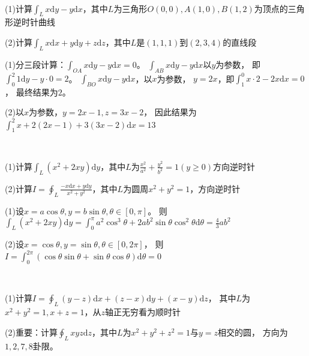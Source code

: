~

\begin{exercise}[折线积分]
  (1)计算$\int_L x\mathrm{d} y - y\mathrm{d} x$，其中$L$为三角形$O(0,0), A(1,0),B(1,2)$为顶点的三角形逆时针曲线

  (2)计算$\int_Lx \mathrm{d} x + y\mathrm{d} y + z\mathrm{d} z$，其中$L$是$(1,1,1)$到$(2,3,4)$的直线段
\end{exercise}

\begin{solution}
  (1)分三段计算：$\int_{OA} x\mathrm{d} y - y\mathrm{d} x = 0$。
  $\int_{AB}x\mathrm{d} y - y\mathrm{d} x$以$y$为参数，
  即$\int_0^2 1 \mathrm{d} y - y \cdot 0 = 2$。
  $\int_{BO}x\mathrm{d} y -y\mathrm{d}x$，以$x$为参数，
  $y = 2x$，即$\int_1^0 x \cdot 2 - 2x \mathrm{d} x = 0$，
  最终结果为$2$。

  (2)以$x$为参数，$y = 2x - 1, z = 3x - 2$，
  因此结果为$\int_1^2 x + 2(2x - 1) + 3(3x - 2)\mathrm{d} x = 13$
\end{solution}

~

\begin{exercise}[椭圆、圆周积分]
  (1)计算$\int_L(x^2 + 2xy)\mathrm{d} y$，其中$L$为$\frac{x^2}{a^2} + \frac{y^2}{b^2} = 1(y \geq 0)$方向逆时针

  (2)计算$I = \oint _L \frac{-x \mathrm{d} x + y\mathrm{d} y}{x^2 + y^2}$，其中$L$为圆周$x^2 + y^2 = 1$，方向逆时针
\end{exercise}

\begin{solution}
  (1)设$x = a \cos \theta, y = b \sin \theta, \theta \in [0,\pi]$。
  则$\int_L (x^2 + 2xy)\mathrm{d} y = \int_0^{\pi} a^2 \cos^3\theta + 2ab^2 \sin \theta \cos^2\theta \mathrm{d} \theta = \frac{4}{3}ab^2$

  (2)设$x = \cos \theta, y = \sin \theta, \theta \in [0,2\pi]$，
  则$I = \int_0^{2\pi}(\cos \theta \sin \theta + \sin \theta \cos \theta)\mathrm{d} \theta = 0$
\end{solution}

~

\begin{exercise}
  (1)计算$I = \oint _L (y-z)\mathrm{d} x + (z - x)\mathrm{d} y + (x - y)\mathrm{d}z$，
  其中$L$为$x^2 + y^2 = 1, x + z = 1$，从$z$轴正无穷看为顺时针

  (2)重要：计算$\oint_L xyz \mathrm{d} z$，其中$L$为$x^2 + y^2 + z^2 = 1$与$y = z$相交的圆，
  方向为$1,2,7,8$卦限。
\end{exercise}

